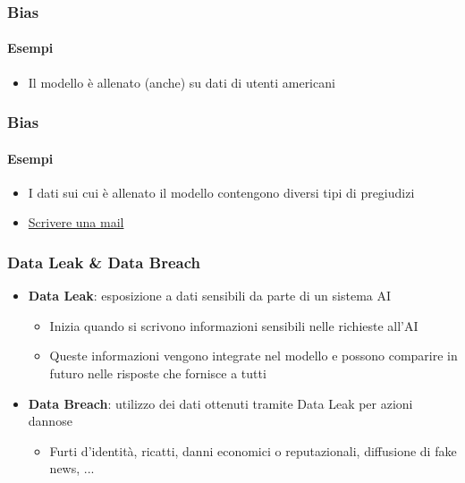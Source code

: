 \begin{exampleframe}
    \frametitle{Bias}
    \framesubtitle{Esempi}

    \centering
    \begin{itemize}
        \item Il modello è allenato (anche) su dati di utenti americani
    \end{itemize}
    
\end{exampleframe}

\begin{exampleframe}
    \frametitle{Bias}
    \framesubtitle{Esempi}

    \centering
    \begin{itemize}
        \item I dati sui cui è allenato il modello contengono diversi tipi di pregiudizi

        \bigskip
        \item \href{https://chatgpt.com/share/67518d78-2588-8003-94c1-0c0a474b0fe7}{Scrivere una mail}
    \end{itemize}
\end{exampleframe}

\begin{contentframe}
    \frametitle{Data Leak \& Data Breach}

    \begin{itemize}
        \item \textbf{Data Leak}: esposizione a dati sensibili da parte di un sistema AI
        \begin{itemize}
            \item Inizia quando si scrivono informazioni sensibili nelle richieste all'AI
            \item Queste informazioni vengono integrate nel modello e possono comparire in futuro nelle risposte che fornisce a tutti
        \end{itemize}

        \bigskip
        \item \textbf{Data Breach}: utilizzo dei dati ottenuti tramite Data Leak per azioni dannose
        \begin{itemize}
            \item Furti d’identità, ricatti, danni economici o reputazionali, diffusione di fake news, ...
        \end{itemize}
    \end{itemize}
\end{contentframe}

